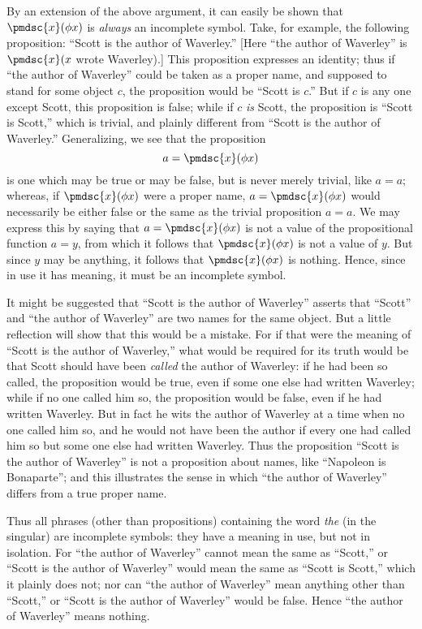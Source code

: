 \documentclass[letterpaper,12pt,openany,leqno]{book}
\begin{document}
By an extension of the above argument, it can easily be shown that $\pmdsc{x}(\phi x)$ is \textit{always} an incomplete symbol. Take, for example, the following proposition: ``Scott is the author of Waverley.'' [Here ``the author of Waverley'' is $\pmdsc{x}(x$ wrote Waverley).] This proposition expresses an identity; thus if ``the author of Waverley'' could be taken as a proper name, and supposed to stand for some object $c$, the proposition would be ``Scott is $c$.'' But if $c$ is any one except Scott, this proposition is false; while if $c$ \textit{is} Scott, the proposition is ``Scott is Scott,'' which is trivial, and plainly different from ``Scott is the author of Waverley.'' Generalizing, we see that the proposition
\[ 
	a=\pmdsc{x}(\phi x)
 \]
is one which may be true or may be false, but is never merely trivial, like $a=a$; whereas, if $\pmdsc{x}(\phi x)$ were a proper name, $a=\pmdsc{x}(\phi x)$ would necessarily be either false or the same as the trivial proposition $a=a$. We may express this by saying that $a=\pmdsc{x}(\phi x)$ is not a value of the propositional function $a=y$, from which it follows that $\pmdsc{x}(\phi x)$ is not a value of $y$. But since $y$ may be anything, it follows that $\pmdsc{x}(\phi x)$ is nothing. Hence, since in use it has meaning, it must be an incomplete symbol.

It might be suggested that ``Scott is the author of Waverley'' asserts that ``Scott'' and ``the author of Waverley'' are two names for the same object. But a little reflection will show that this would be a mistake. For if that were the meaning of ``Scott is the author of Waverley,'' what would be required for its truth would be that Scott should have been \textit{called} the author of Waverley: if he had been so called, the proposition would be true, even if some one else had written Waverley; while if no one called him so, the proposition would be false, even if he had written Waverley. But in fact he wits the author of Waverley at a time when no one called him so, and he would not have been the author if every one had called him so but some one else had written Waverley. Thus the proposition ``Scott is the author of Waverley'' is not a proposition about names, like ``Napoleon is Bonaparte''; and this illustrates the sense in which ``the author of Waverley'' differs from a true proper name.

Thus all phrases (other than propositions) containing the word \textit{the} (in the singular) are incomplete symbols: they have a meaning in use, but not in isolation. For ``the author of Waverley'' cannot mean the same as ``Scott,'' or ``Scott is the author of Waverley'' would mean the same as ``Scott is Scott,'' which it plainly does not; nor can ``the author of Waverley'' mean anything other than ``Scott,'' or ``Scott is the author of Waverley'' would be false. Hence ``the author of Waverley'' means nothing.
\end{document}
